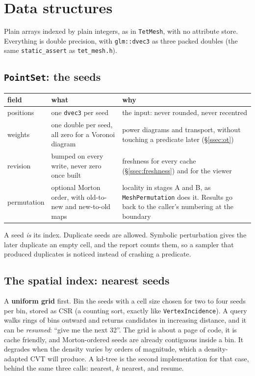 \documentclass[11pt,a4paper]{article}
\newcommand{\code}[1]{\texttt{#1}}          %
\newcommand{\secref}[1]{\S\ref{#1}}
\begin{document}
\section{Data structures}\label{sec:data}

Plain arrays indexed by plain integers, as in \code{TetMesh}, with no attribute store.
Everything is double precision, with \code{glm::dvec3} as three packed doubles (the same
\code{static\_assert} as \code{tet\_mesh.h}).

\subsection{\texorpdfstring{\code{PointSet}}{PointSet}: the seeds}\label{ssec:pointset}

{\small
\begin{xltabular}{\linewidth}{@{}P{2.2cm} L L@{}}
\toprule
field & what & why \\
\midrule
\endhead
positions   & one \code{dvec3} per seed
            & the input: never rounded, never recentred \\
weights     & one double per seed, all zero for a Voronoi diagram
            & power diagrams and transport, without touching a predicate later
              (\secref{ssec:ot}) \\
revision    & bumped on every write, never zero once built
            & freshness for every cache (\secref{ssec:freshness}) and for the viewer \\
permutation & optional Morton order, with old-to-new and new-to-old maps
            & locality in stages A and B, as \code{MeshPermutation} does it. Results go back to
              the caller's numbering at the boundary \\
\bottomrule
\end{xltabular}}

A seed \emph{is} its index. Duplicate seeds are allowed. Symbolic perturbation gives the later
duplicate an empty cell, and the report counts them, so a sampler that produced duplicates is
noticed instead of crashing a predicate.

\subsection{The spatial index: nearest seeds}\label{ssec:grid}

A \textbf{uniform grid} first. Bin the seeds with a cell size chosen for two to four seeds per
bin, stored as CSR (a counting sort, exactly like \code{VertexIncidence}). A query walks rings
of bins outward and returns candidates in increasing distance, and it can be \emph{resumed}:
``give me the next 32''. The grid is about a page of code, it is cache friendly, and
Morton-ordered seeds are already contiguous inside a bin. It degrades when the density varies
by orders of magnitude, which a density-adapted CVT will produce. A kd-tree is the second
implementation for that case, behind the same three calls: nearest, $k$ nearest, and resume.
\end{document}
